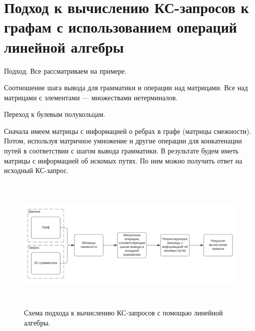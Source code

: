 \chapter{Подход к вычислению КС-запросов к графам с использованием операций линейной алгебры}\label{ch:ch2}

Подход. Все рассматриваем на примере.

Соотношение шага вывода для грамматики и операции над матрицами. Все над матрицами с элементами --- множествами нетерминалов.

Переход к булевым полукольцам.


Сначала имеем матрицы с информацией о ребрах в графе (матрицы смежности). Потом, используя матричное умножение и другие операции для конкатенации путей в соответствии с шагом вывода грамматики. В результате будем иметь матрицы с информацией об искомых путях. По ним можно получить ответ на исходный КС-запрос.


	\begin{figure}
		\begin{center}
		\includegraphics[height=6.5cm]{dissertation/images/scheme.pdf}
	\end{center}
	\caption{Схема подхода к вычислению КС-запросов с помощью линейной алгебры.}
	\end{figure}

	


\FloatBarrier
